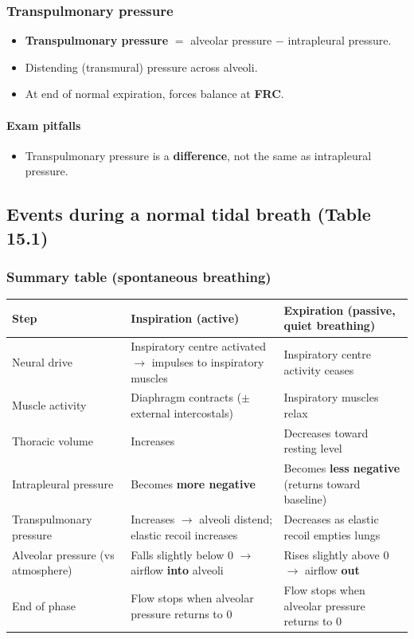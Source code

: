 \documentclass[11pt,a4paper]{article}
\begin{document}
\subsubsection{Transpulmonary pressure}
\begin{itemize}[leftmargin=*,nosep]
  \item \textbf{Transpulmonary pressure} $=$ alveolar pressure $-$ intrapleural pressure.
  \item Distending (transmural) pressure across alveoli.
  \item At end of normal expiration, forces balance at \textbf{FRC}.
\end{itemize}

\paragraph{Exam pitfalls}
\begin{itemize}[leftmargin=*,nosep]
  \item Transpulmonary pressure is a \textbf{difference}, not the same as intrapleural pressure.
\end{itemize}

\subsection{Events during a normal tidal breath (Table 15.1)}

\subsubsection{Summary table (spontaneous breathing)}
\begin{table}[h!]
\centering
\begin{tabularx}{\textwidth}{@{}lXX@{}}
\toprule
\textbf{Step} & \textbf{Inspiration (active)} & \textbf{Expiration (passive, quiet breathing)}\\
\midrule
Neural drive & Inspiratory centre activated $\rightarrow$ impulses to inspiratory muscles & Inspiratory centre activity ceases\\
Muscle activity & Diaphragm contracts ($\pm$ external intercostals) & Inspiratory muscles relax\\
Thoracic volume & Increases & Decreases toward resting level\\
Intrapleural pressure & Becomes \textbf{more negative} & Becomes \textbf{less negative} (returns toward baseline)\\
Transpulmonary pressure & Increases $\rightarrow$ alveoli distend; elastic recoil increases & Decreases as elastic recoil empties lungs\\
Alveolar pressure (vs atmosphere) & Falls slightly below 0 $\rightarrow$ airflow \textbf{into} alveoli & Rises slightly above 0 $\rightarrow$ airflow \textbf{out}\\
End of phase & Flow stops when alveolar pressure returns to 0 & Flow stops when alveolar pressure returns to 0\\
\bottomrule
\end{tabularx}
\end{table}
\end{document}
